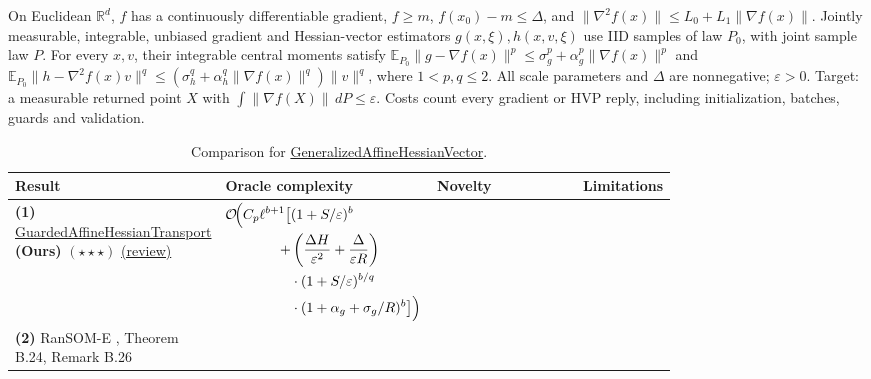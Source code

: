 \begin{table}[tp]
\centering
\caption{Comparison for \href{https://github.com/k3nfalt/longtails/blob/main/LongTails/Setups/GeneralizedAffineHessianVector.lean}{GeneralizedAffineHessianVector}.}\label{tab:GeneralizedAffineHessianVector}
\parbox{\linewidth}{\footnotesize On Euclidean $\mathbb{R}^d$, $f$ has a continuously differentiable gradient, $f\ge m$, $f(x_0)-m\le\Delta$, and $\|\nabla^2 f(x)\|\le L_0+L_1\|\nabla f(x)\|$. Jointly measurable, integrable, unbiased gradient and Hessian-vector estimators $g(x,\xi),h(x,v,\xi)$ use IID samples of law $P_0$, with joint sample law $P$. For every $x,v$, their integrable central moments satisfy $\mathbb{E}_{P_0}\|g-\nabla f(x)\|^p\le\sigma_g^p+\alpha_g^p\|\nabla f(x)\|^p$ and $\mathbb{E}_{P_0}\|h-\nabla^2 f(x)v\|^q\le(\sigma_h^q+\alpha_h^q\|\nabla f(x)\|^q)\|v\|^q$, where $1<p,q\le2$. All scale parameters and $\Delta$ are nonnegative; $\varepsilon>0$. Target: a measurable returned point $X$ with $\int\|\nabla f(X)\|\,dP\le\varepsilon$. Costs count every gradient or HVP reply, including initialization, batches, guards and validation.}\par\smallskip
\begin{threeparttable}
\footnotesize
\setlength{\tabcolsep}{4pt}\renewcommand{\arraystretch}{1.25}
\begin{tabularx}{\linewidth}{@{}>{\raggedright\arraybackslash}p{0.20\linewidth}>{\raggedright\arraybackslash}p{0.32\linewidth}>{\raggedright\arraybackslash}p{0.25\linewidth}>{\raggedright\arraybackslash}X@{}}
\toprule
\textbf{Result} & \textbf{Oracle complexity} & \textbf{Novelty} & \textbf{Limitations} \\
\midrule
\textbf{(1)} \href{https://github.com/k3nfalt/longtails/blob/main/LongTails/Theorems/GuardedAffineHessianTransport.lean}{Guarded\allowbreak Affine\allowbreak Hessian\allowbreak Transport} \textbf{(Ours)} $(\star\star\star)$ \href{https://github.com/k3nfalt/longtails/blob/main/scripts/reviews/GuardedAffineHessianTransport.md}{(review)}
& $\begin{aligned}[t]
\mathcal{O}\!\Bigl(C_p\ell^{b+1}\bigl[&(1+S/\varepsilon)^b\\
+{}&\left(\frac{\Delta H}{\varepsilon^2}+\frac{\Delta}{\varepsilon R}\right)\\
&\cdot(1+S/\varepsilon)^{b/q}\\
&\cdot(1+\alpha_g+\sigma_g/R)^b\bigr]\Bigr)
\end{aligned}$ & & \\
\midrule[1.2pt]
\textbf{(2)} RanSOM-E \citep{gahChaytiFakhouri2026v3}, Theorem B.24, Remark B.26

\end{tabularx}
\end{threeparttable}
\end{table}
